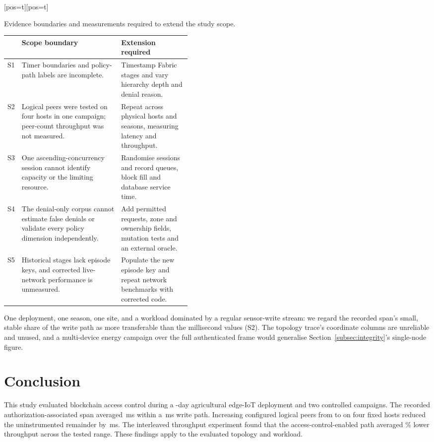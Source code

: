 \documentclass[a4paper,fleqn]{cas-sc}
\makeatletter
\newenvironment{widetab}[1][pos=t]
  {\ifdoublecol \@nameuse{table*}[#1]\else \@nameuse{table}[#1]\fi}
  {\ifdoublecol \@nameuse{endtable*}\else \@nameuse{endtable}\fi}
\makeatother
\begin{document}
\begin{widetab}[pos=t]
\caption{Evidence boundaries and measurements required to extend the study scope.}
\label{tab:canonlimits}
\footnotesize
\begin{tabularx}{\linewidth}{@{}p{0.05\linewidth}Xp{0.38\linewidth}@{}}
\toprule
& Scope boundary & Extension required \\
\midrule
S1 & Timer boundaries and policy-path labels are incomplete. &
     Timestamp Fabric stages and vary hierarchy depth and denial reason. \\
S2 & Logical peers were tested on four hosts in one campaign; peer-count throughput was not measured. &
     Repeat across physical hosts and seasons, measuring latency and throughput. \\
S3 & One ascending-concurrency session cannot identify capacity or the limiting resource. &
     Randomise sessions and record queues, block fill and database service time. \\
S4 & The denial-only corpus cannot estimate false denials or validate every policy dimension independently. &
     Add permitted requests, zone and ownership fields, mutation tests and an external oracle. \\
S5 & Historical stages lack episode keys, and corrected live-network performance is unmeasured. &
     Populate the new episode key and repeat network benchmarks with corrected code. \\
\bottomrule
\end{tabularx}
\end{widetab}

One deployment, one season, one site, and a workload dominated by a
regular sensor-write stream: we regard the recorded span's small, stable
share of the write path as more transferable than the millisecond values
(S2). The topology trace's coordinate columns are unreliable and unused,
and a multi-device energy campaign over the full authenticated frame would
generalise Section~\ref{subsec:integrity}'s single-node figure.

\FloatBarrier
\section{Conclusion}
\label{sec:conclusion}

This study evaluated blockchain access control during a \DeployDays-day
agricultural edge-IoT deployment and two controlled campaigns. The recorded
authorization-associated span averaged \PartAccess\,ms within a
\PartTotal\,ms write path. Increasing configured logical peers from
\ScaleMinPeers{} to \ScaleMaxPeers{} on four fixed hosts reduced the
uninstrumented remainder by \PartEndorser\,ms. The interleaved throughput
experiment found that the access-control-enabled path averaged
\OverheadMeanPct\% lower throughput across the tested range. These findings
apply to the evaluated topology and workload.
\end{document}
